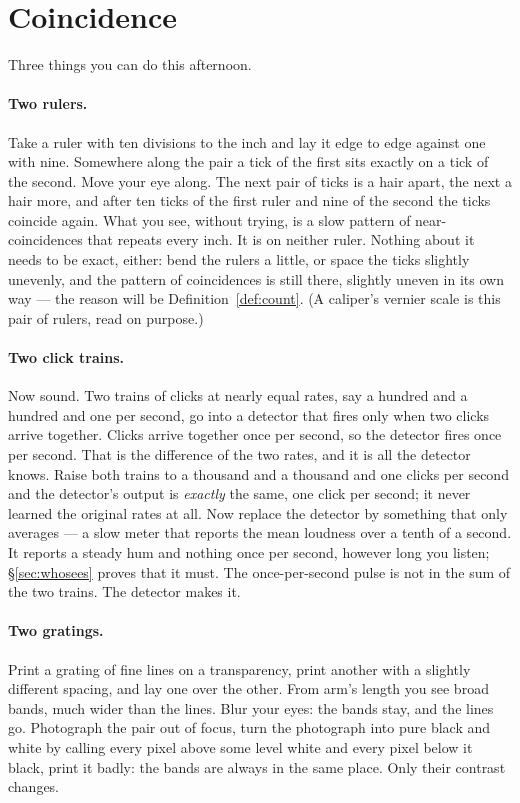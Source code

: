 \section{Coincidence}
\label{sec:coincidence}

Three things you can do this afternoon.

\paragraph{Two rulers.}
Take a ruler with ten divisions to the inch and lay it edge to edge against
one with nine. Somewhere along the pair a tick of the first sits exactly on a
tick of the second. Move your eye along. The next pair of ticks is a hair
apart, the next a hair more, and after ten ticks of the first ruler and nine
of the second the ticks coincide again. What you see, without trying, is a
slow pattern of near-coincidences that repeats every inch. It is on neither
ruler. Nothing about it needs to be exact, either: bend the rulers a little,
or space the ticks slightly unevenly, and the pattern of coincidences is
still there, slightly uneven in its own way --- the reason will be
Definition~\ref{def:count}. (A caliper's vernier scale is this pair of
rulers, read on purpose.)

\paragraph{Two click trains.}
Now sound. Two trains of clicks at nearly equal rates, say a hundred and a
hundred and one per second, go into a detector that fires only when two
clicks arrive together. Clicks arrive together once per second, so the
detector fires once per second. That is the difference of the two rates,
and it is all the detector knows. Raise both trains to a thousand and a
thousand and one clicks per second and the detector's output is
\emph{exactly} the same, one click per second; it never learned the
original rates at all. Now replace the detector by something that only
averages --- a slow meter that reports the mean loudness over a tenth of a
second. It reports a steady hum and nothing once per second, however long
you listen; \S\ref{sec:whosees} proves that it must. The once-per-second
pulse is not in the sum of the two trains. The detector makes it.

\paragraph{Two gratings.}
Print a grating of fine lines on a transparency, print another with a
slightly different spacing, and lay one over the other. From arm's length
you see broad bands, much wider than the lines. Blur your eyes: the bands
stay, and the lines go. Photograph the pair out of focus, turn the
photograph into pure black and white by calling every pixel above some
level white and every pixel below it black, print it badly: the bands are
always in the same place. Only their contrast changes.

